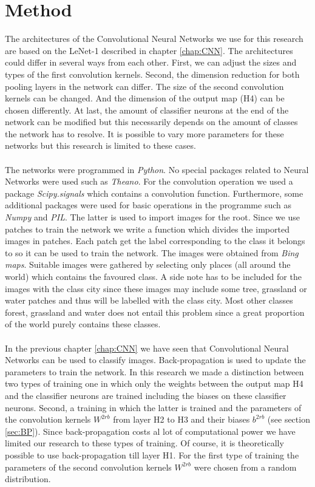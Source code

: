 \documentclass[a4paper,onecolumn]{report}
\begin{document}
\chapter{Method}
\label{chap:method}
The architectures of the Convolutional Neural Networks we use for this research are based on the LeNet-1 described in chapter \ref{chap:CNN}. The architectures could differ in several ways from each other. First, we can adjust the sizes and types of the first convolution kernels. Second, the dimension reduction for both pooling layers in the network can differ. The size of the second convolution kernels can be changed. And the dimension of the output map (H4) can be chosen differently. At last, the amount of classifier neurons at the end of the network can be modified but this necessarily depends on the amount of classes the network has to resolve.  It is possible to vary more parameters for these networks but this research is limited to these cases.
\\\\
The networks were programmed in \textit{Python}. No special packages related to Neural Networks were used such as \textit{Theano}. For the convolution operation we used a package \textit{Scipy.signals} which contains a convolution function. Furthermore, some additional packages were used for basic operations in the programme such as \textit{Numpy} and \textit{PIL}. The latter is used to import images for the root. Since we use patches to train the network we write a function which divides the imported images in patches. Each patch get the label corresponding to the class it belongs to so it can be used to train the network. The images were obtained from \textit{Bing maps}. Suitable images were gathered by selecting only places (all around the world) which contains the favoured class. A side note has to be included for the images with the class city since these images may include some tree, grassland or water patches and thus will be labelled with the class city. Most other classes forest, grassland and water does not entail this problem since a great proportion of the world purely contains these classes.
\\\\
In the previous chapter \ref{chap:CNN} we have seen that Convolutional Neural Networks can be used to classify images. Back-propagation is used to update the parameters to train the network. In this research we made a distinction between two types of training one in which only the weights between the output map H4 and the classifier neurons are trained including the biases on these classifier neurons. Second, a training in which the latter is trained and the parameters of the convolution kernels $W^{2rb}$ from layer H2 to H3 and their biases $b^{2rb}$ (see section \ref{sec:BP}). Since back-propagation costs al lot of computational power we have limited our research to these types of training. Of course, it is theoretically possible to use back-propagation till layer H1. For the first type of training the parameters of the second convolution kernels  $W^{2rb}$ were chosen from a random distribution. 
\end{document}
